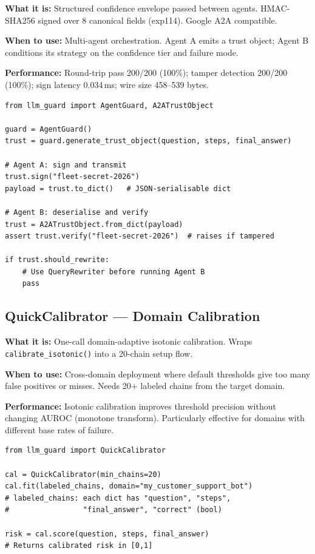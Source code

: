 \documentclass[11pt,a4paper]{article}
\begin{document}
\textbf{What it is:} Structured confidence envelope passed between agents.
HMAC-SHA256 signed over 8 canonical fields (exp114). Google A2A compatible.

\textbf{When to use:} Multi-agent orchestration. Agent A emits a trust object;
Agent B conditions its strategy on the confidence tier and failure mode.

\textbf{Performance:} Round-trip pass 200/200 (100\%); tamper detection
200/200 (100\%); sign latency 0.034\,ms; wire size 458--539 bytes.

\begin{lstlisting}
from llm_guard import AgentGuard, A2ATrustObject

guard = AgentGuard()
trust = guard.generate_trust_object(question, steps, final_answer)

# Agent A: sign and transmit
trust.sign("fleet-secret-2026")
payload = trust.to_dict()   # JSON-serialisable dict

# Agent B: deserialise and verify
trust = A2ATrustObject.from_dict(payload)
assert trust.verify("fleet-secret-2026")  # raises if tampered

if trust.should_rewrite:
    # Use QueryRewriter before running Agent B
    pass
\end{lstlisting}

\subsection{QuickCalibrator --- Domain Calibration}

\textbf{What it is:} One-call domain-adaptive isotonic calibration. Wraps
\texttt{calibrate\_isotonic()} into a 20-chain setup flow.

\textbf{When to use:} Cross-domain deployment where default thresholds give
too many false positives or misses. Needs 20+ labeled chains from the target
domain.

\textbf{Performance:} Isotonic calibration improves threshold precision
without changing AUROC (monotone transform). Particularly effective for
domains with different base rates of failure.

\begin{lstlisting}
from llm_guard import QuickCalibrator

cal = QuickCalibrator(min_chains=20)
cal.fit(labeled_chains, domain="my_customer_support_bot")
# labeled_chains: each dict has "question", "steps",
#                 "final_answer", "correct" (bool)

risk = cal.score(question, steps, final_answer)
# Returns calibrated risk in [0,1]
\end{lstlisting}
\end{document}
